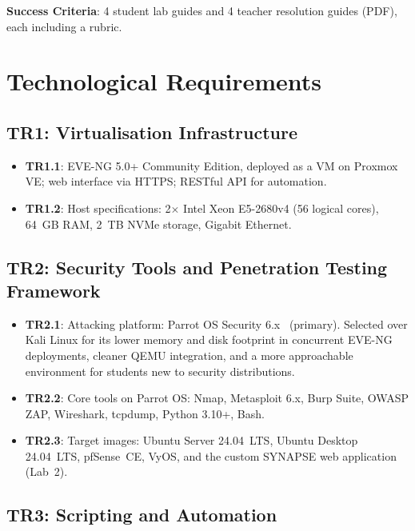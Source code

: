 \textbf{Success Criteria}: 4 student lab guides and 4 teacher resolution guides (PDF),
each including a rubric.

\section{Technological Requirements}

\subsection{TR1: Virtualisation Infrastructure}

\begin{itemize}
\item \textbf{TR1.1}: EVE-NG 5.0+ Community Edition, deployed as a
      VM on Proxmox VE; web interface via HTTPS; RESTful API for automation.

\item \textbf{TR1.2}: Host specifications: 2$\times$ Intel Xeon E5-2680v4 (56 logical cores),
      64~GB RAM, 2~TB NVMe storage, Gigabit Ethernet.
\end{itemize}

\subsection{TR2: Security Tools and Penetration Testing Framework}

\begin{itemize}
\item \textbf{TR2.1}: Attacking platform: Parrot OS Security 6.x~\cite{parrot_os} (primary).
      Selected over Kali Linux for its lower memory and disk footprint in concurrent EVE-NG
      deployments, cleaner QEMU integration, and a more approachable environment for
      students new to security distributions.

\item \textbf{TR2.2}: Core tools on Parrot OS: Nmap, Metasploit 6.x\cite{metasploit},
      Burp Suite\cite{burp_suite}, OWASP ZAP\cite{owasp_zap}, Wireshark\cite{wireshark},
      tcpdump, Python 3.10+, Bash.

\item \textbf{TR2.3}: Target images: Ubuntu Server 24.04~LTS, Ubuntu Desktop 24.04~LTS,
      pfSense~CE, VyOS, and the custom SYNAPSE web application (Lab~2).
\end{itemize}

\subsection{TR3: Scripting and Automation}

